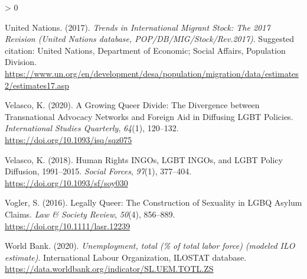 \documentclass[
  11pt,
]{article}
\newlength{\cslhangindent}
\newenvironment{CSLReferences}[2] %
 {%
  \setlength{\parindent}{0pt}
  \ifodd #1 \everypar{\setlength{\hangindent}{\cslhangindent}}\ignorespaces\fi
  \ifnum #2 > 0
  \setlength{\parskip}{#2\baselineskip}
  \fi
 }%
 {}
\begin{document}
\begin{CSLReferences}{1}{0}
\leavevmode\hypertarget{ref-unitednations_2017}{}%
United Nations. (2017). \emph{Trends in {International} {Migrant} {Stock}: {The} 2017 {Revision} ({United} {Nations} database, {POP}/{DB}/{MIG}/{Stock}/{Rev}.2017)}. Suggested citation: United Nations, Department of Economic; Social Affairs, Population Division. \url{https://www.un.org/en/development/desa/population/migration/data/estimates2/estimates17.asp}

\leavevmode\hypertarget{ref-velasco_2020}{}%
Velasco, K. (2020). A {Growing} {Queer} {Divide}: {The} {Divergence} between {Transnational} {Advocacy} {Networks} and {Foreign} {Aid} in {Diffusing} {LGBT} {Policies}. \emph{International Studies Quarterly}, \emph{64}(1), 120--132. \url{https://doi.org/10.1093/isq/sqz075}

\leavevmode\hypertarget{ref-velasco_2018}{}%
Velasco, K. (2018). Human {Rights} {INGOs}, {LGBT} {INGOs}, and {LGBT} {Policy} {Diffusion}, 1991--2015. \emph{Social Forces}, \emph{97}(1), 377--404. \url{https://doi.org/10.1093/sf/soy030}

\leavevmode\hypertarget{ref-vogler_2016}{}%
Vogler, S. (2016). Legally {Queer}: {The} {Construction} of {Sexuality} in {LGBQ} {Asylum} {Claims}. \emph{Law \& Society Review}, \emph{50}(4), 856--889. \url{https://doi.org/10.1111/lasr.12239}

\leavevmode\hypertarget{ref-worldbank_2020}{}%
World Bank. (2020). \emph{Unemployment, total (\% of total labor force) (modeled {ILO} estimate)}. International Labour Organization, ILOSTAT database. \url{https://data.worldbank.org/indicator/SL.UEM.TOTL.ZS}

\end{CSLReferences}
\end{document}
